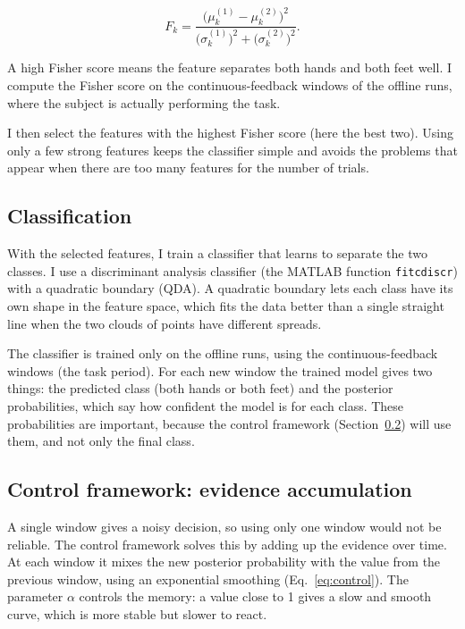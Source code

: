 \documentclass[10pt,twocolumn,a4paper]{article}
\begin{document}
\begin{equation}
\label{eq:fisher}
F_k = \frac{\big(\mu_k^{(1)}-\mu_k^{(2)}\big)^2}
           {\big(\sigma_k^{(1)}\big)^2 + \big(\sigma_k^{(2)}\big)^2} .
\end{equation}

A high Fisher score means the feature separates both hands and both feet well. I
compute the Fisher score on the continuous-feedback windows of the offline runs,
where the subject is actually performing the task.

I then select the features with the highest Fisher score (here the best two).
Using only a few strong features keeps the classifier simple and avoids the
problems that appear when there are too many features for the number of trials.

\subsection{Classification}
\label{sec:clf}

With the selected features, I train a classifier that learns to separate the two
classes. I use a discriminant analysis classifier (the MATLAB function
\texttt{fitcdiscr}) with a quadratic boundary (QDA). A quadratic boundary lets
each class have its own shape in the feature space, which fits the data better
than a single straight line when the two clouds of points have different spreads.

The classifier is trained only on the offline runs, using the
continuous-feedback windows (the task period). For each new window the trained
model gives two things: the predicted class (both hands or both feet) and the
posterior probabilities, which say how confident the model is for each class.
These probabilities are important, because the control framework
(Section~\ref{sec:control}) will use them, and not only the final class.

\subsection{Control framework: evidence accumulation}
\label{sec:control}

A single window gives a noisy decision, so using only one window would not be
reliable. The control framework solves this by adding up the evidence over time.
At each window it mixes the new posterior probability with the value from the
previous window, using an exponential smoothing (Eq.~\ref{eq:control}). The
parameter $\alpha$ controls the memory: a value close to 1 gives a slow and
smooth curve, which is more stable but slower to react.
\end{document}
